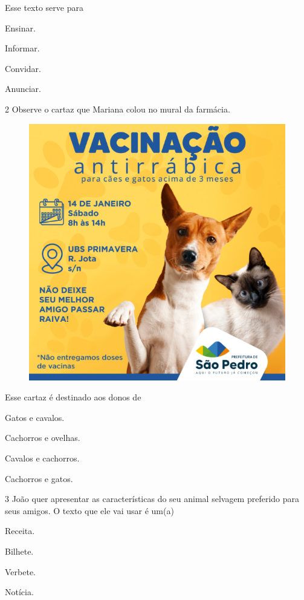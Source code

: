 Esse texto serve para

\begin{escolha}
	\item Ensinar.

	\item Informar.

	\item Convidar.

	\item Anunciar.
\end{escolha}

\num{2} Observe o cartaz que Mariana colou no mural da farmácia.

\begin{figure}[H]
\centering
\includegraphics[width=.6\textwidth]{media/image115.png}
\end{figure}

Esse cartaz é destinado aos donos de 

\begin{escolha}
	\item Gatos e cavalos.

	\item Cachorros e ovelhas.

	\item Cavalos e cachorros.

	\item Cachorros e gatos.
\end{escolha}

\num{3} João quer apresentar as características do seu animal selvagem
preferido para seus amigos.
O texto que ele vai usar é um(a)

\begin{escolha}
	\item Receita.

	\item Bilhete.

	\item Verbete.

	\item Notícia.
\end{escolha}

